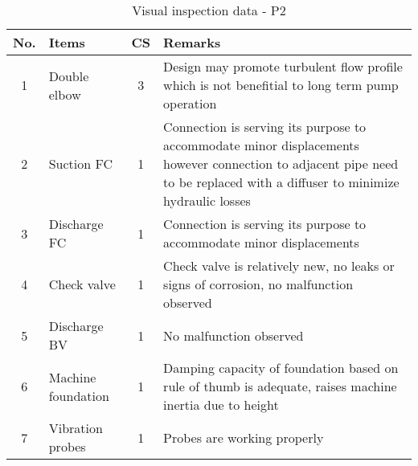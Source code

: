 \begin{table}[!htb]
	\caption{Visual inspection data - P2}
	\label{ch043_tbl_visualinspectionP2}
		{\scriptsize
\begin{tabular}{c|l|c|p{9.5cm}}
	\hline
	No. & Items & CS & Remarks \\ 

\hline
1 & Double elbow & 3 & Design may promote turbulent flow profile which is not benefitial to long term pump operation \\ 
2 & Suction FC & 1 & Connection is serving its purpose to accommodate minor displacements however connection to adjacent pipe need to be replaced with a diffuser to minimize hydraulic losses\\ 
3 & Discharge FC & 1 & Connection is serving its purpose to accommodate minor displacements \\ 
4 & Check valve & 1 & Check valve is relatively new, no leaks or signs of corrosion, no malfunction observed \\ 
5 & Discharge BV & 1 & No malfunction observed \\ 
6 & Machine foundation & 1 & Damping capacity of foundation based on rule of thumb is adequate, raises machine inertia due to height  \\ 
7 & Vibration probes & 1 & Probes are working properly \\ 
\hline
\end{tabular}
	}
\end{table}